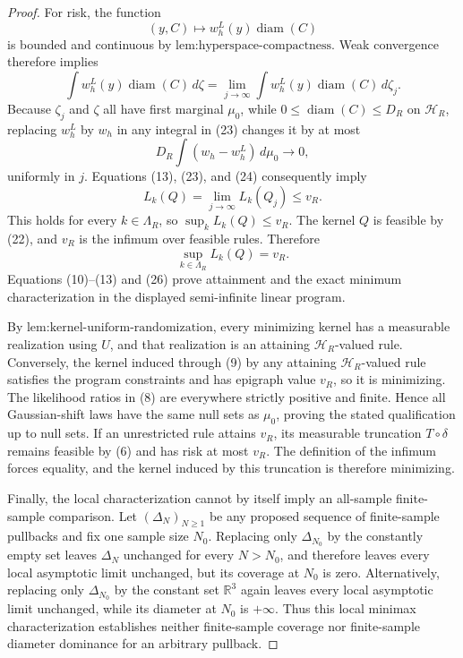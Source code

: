 \documentclass{article}
\begin{document}
\begin{proof}
For risk, the function
\[
 (y,C)\longmapsto w_h^L(y)\operatorname{diam}(C)
\]
is bounded and continuous by \(\text{lem:hyperspace-compactness}\).  Weak convergence therefore implies
\[
 \int w_h^L(y)\operatorname{diam}(C)\,d\zeta
 =\lim_{j\to\infty}
 \int w_h^L(y)\operatorname{diam}(C)\,d\zeta_j.
\tag{23}
\]
Because \(\zeta_j\) and \(\zeta\) all have first marginal \(\mu_0\), while \(0\le\operatorname{diam}(C)\le D_R\) on \(\mathcal H_R\), replacing \(w_h^L\) by \(w_h\) in any integral in (23) changes it by at most
\[
 D_R\int(w_h-w_h^L)\,d\mu_0\longrightarrow0,
\tag{24}
\]
uniformly in \(j\).  Equations (13), (23), and (24) consequently imply
\[
 L_k(Q)=\lim_{j\to\infty}L_k(Q_j)\le v_R.
\tag{25}
\]
This holds for every \(k\in\Lambda_R\), so \(\sup_kL_k(Q)\le v_R\).  The kernel \(Q\) is feasible by (22), and \(v_R\) is the infimum over feasible rules.  Therefore
\[
 \sup_{k\in\Lambda_R}L_k(Q)=v_R.
\tag{26}
\]
Equations (10)--(13) and (26) prove attainment and the exact minimum characterization in the displayed semi-infinite linear program.

By \(\text{lem:kernel-uniform-randomization}\), every minimizing kernel has a measurable realization using \(U\), and that realization is an attaining \(\mathcal H_R\)-valued rule.  Conversely, the kernel induced through (9) by any attaining \(\mathcal H_R\)-valued rule satisfies the program constraints and has epigraph value \(v_R\), so it is minimizing.  The likelihood ratios in (8) are everywhere strictly positive and finite.  Hence all Gaussian-shift laws have the same null sets as \(\mu_0\), proving the stated qualification up to null sets.  If an unrestricted rule attains \(v_R\), its measurable truncation \(T\circ\delta\) remains feasible by (6) and has risk at most \(v_R\).  The definition of the infimum forces equality, and the kernel induced by this truncation is therefore minimizing.

Finally, the local characterization cannot by itself imply an all-sample finite-sample comparison.  Let \((\Delta_N)_{N\ge1}\) be any proposed sequence of finite-sample pullbacks and fix one sample size \(N_0\).  Replacing only \(\Delta_{N_0}\) by the constantly empty set leaves \(\Delta_N\) unchanged for every \(N>N_0\), and therefore leaves every local asymptotic limit unchanged, but its coverage at \(N_0\) is zero.  Alternatively, replacing only \(\Delta_{N_0}\) by the constant set \(\mathbb R^3\) again leaves every local asymptotic limit unchanged, while its diameter at \(N_0\) is \(+\infty\).  Thus this local minimax characterization establishes neither finite-sample coverage nor finite-sample diameter dominance for an arbitrary pullback.
\end{proof}
\end{document}
